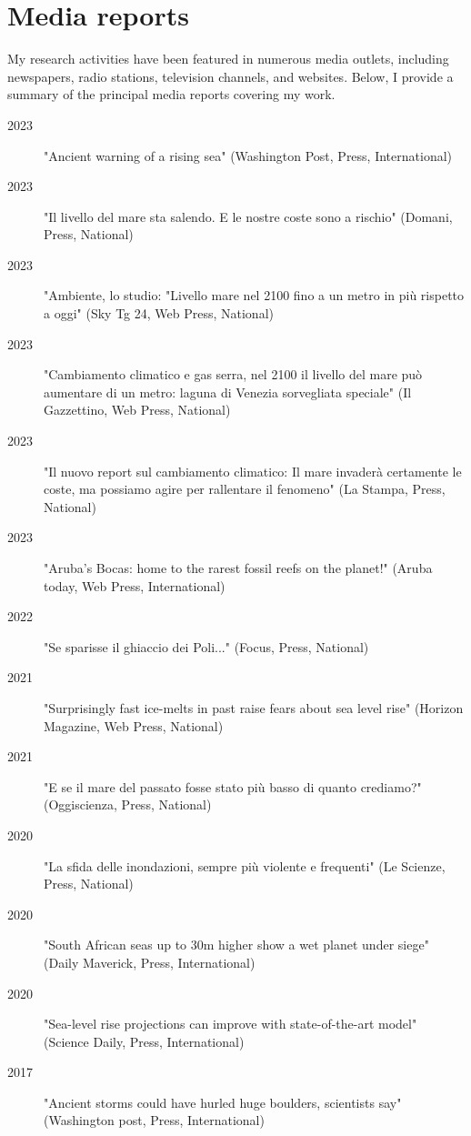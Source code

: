 \documentclass[11pt]{article}
\begin{document}
\section{Media reports}
{\normalfont My research activities have been featured in numerous media outlets, including newspapers, radio stations, television channels, and websites. Below, I provide a summary of the principal media reports covering my work.}\\
{\footnotesize 
\begin{description}
  \item [2023] "Ancient warning of a rising sea" (Washington Post, Press, International)
  \item [2023] "Il livello del mare sta salendo. E le nostre coste sono a rischio" (Domani, Press, National) 
  \item [2023] "Ambiente, lo studio: "Livello mare nel 2100 fino a un metro in più rispetto a oggi" (Sky Tg 24, Web Press, National) 
   \item [2023] "Cambiamento climatico e gas serra, nel 2100 il livello del mare può aumentare di un metro: laguna di Venezia sorvegliata speciale" (Il Gazzettino, Web Press, National) 
  \item [2023] "Il nuovo report sul cambiamento climatico: Il mare invaderà certamente le coste, ma possiamo agire per rallentare il fenomeno" (La Stampa, Press, National) 
  \item [2023] "Aruba’s Bocas: home to the rarest fossil reefs on the planet!" (Aruba today, Web Press, International) 
  \item [2022] "Se sparisse il ghiaccio dei Poli..." (Focus, Press, National) 
  \item [2021] "Surprisingly fast ice-melts in past raise fears about sea level rise" (Horizon Magazine, Web Press, National) 
  \item [2021] "E se il mare del passato fosse stato più basso di quanto crediamo?" (Oggiscienza, Press, National) 
  \item [2020] "La sfida delle inondazioni, sempre più violente e frequenti" (Le Scienze, Press, National) 
  \item [2020] "South African seas up to 30m higher show a wet planet under siege" (Daily Maverick, Press, International) 
  \item [2020] "Sea-level rise projections can improve with state-of-the-art model" (Science Daily, Press, International) 
  \item [2017] "Ancient storms could have hurled huge boulders, scientists say" (Washington post, Press, International) 

\end{description}}
\end{document}
